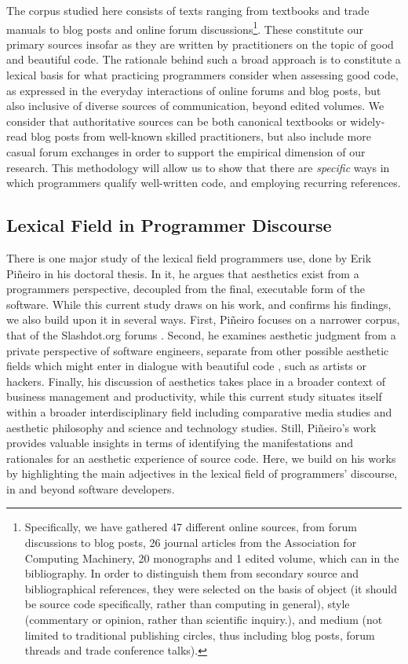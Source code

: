 The corpus studied here consists of texts ranging from textbooks and trade manuals to blog posts and online forum discussions\footnote{Specifically, we have gathered 47 different online sources, from forum discussions to blog posts, 26 journal articles from the Association for Computing Machinery, 20 monographs and 1 edited volume, which can in the bibliography. In order to distinguish them from secondary source and bibliographical references, they were selected on the basis of object (it should be source code specifically, rather than computing in general), style (commentary or opinion, rather than scientific inquiry.), and medium (not limited to traditional publishing circles, thus including blog posts, forum threads and trade conference talks).}. These constitute our primary sources insofar as they are written by practitioners on the topic of good and beautiful code. The rationale behind such a broad approach is to constitute a lexical basis for what practicing programmers consider when assessing good code, as expressed in the everyday interactions of online forums and blog posts, but also inclusive of diverse sources of communication, beyond edited volumes. We consider that authoritative sources can be both canonical textbooks or widely-read blog posts from well-known skilled practitioners, but also include more casual forum exchanges in order to support the empirical dimension of our research. This methodology will allow us to show that there are \emph{specific} ways in which programmers qualify well-written code, and employing recurring references.

\subsection{Lexical Field in Programmer Discourse}
\label{subsec:lexical-fields}

There is one major study of the lexical field programmers use, done by Erik Piñeiro in his doctoral thesis. In it, he argues that aesthetics exist from a programmers perspective, decoupled from the final, executable form of the software. While this current study draws on his work, and confirms his findings, we also build upon it in several ways. First, Piñeiro focuses on a narrower corpus, that of the Slashdot.org forums \citep{pineiro_aesthetics_2003}. Second, he examines aesthetic judgment from a private perspective of software engineers, separate from other possible aesthetic fields which might enter in dialogue with beautiful code \citep{pineiro_aesthetics_2003}, such as artists or hackers. Finally, his discussion of aesthetics takes place in a broader context of business management and productivity, while this current study situates itself within a broader interdisciplinary field including comparative media studies and aesthetic philosophy and science and technology studies. Still, Piñeiro's work provides valuable insights in terms of identifying the manifestations and rationales for an aesthetic experience of source code. Here, we build on his works by highlighting the main adjectives in the lexical field of programmers' discourse, in and beyond software developers.

